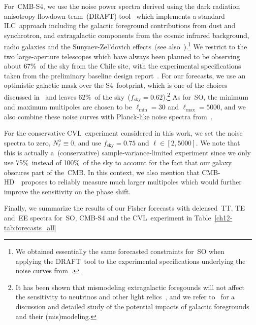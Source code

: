 \begin{subappendices}
For~\mbox{CMB-S4}, we use the noise power spectra derived using the dark radiation anisotropy flowdown team~(DRAFT) tool~\cite{CMB-S4:inprep, Raghunathan:draft} which implements a standard ILC~approach including the galactic foreground contributions from dust and synchrotron, and extragalactic components from the cosmic infrared background, radio galaxies and the Sunyaev-Zel'dovich effects~(see also~\cite{Raghunathan:2023yfe}).\footnote{We obtained essentially the same forecasted constraints for~SO when applying the DRAFT~tool to the experimental specifications underlying the noise curves from~\cite{SimonsObservatory:2020noise}.} We restrict to the two large-aperture telescopes which have always been planned to be observing about 67\%~of the sky from the Chile site, with the experimental specifications taken from the preliminary baseline design report~\cite{CMB-S4:pbdr}. For our forecasts, we use an optimistic galactic mask over the S4~footprint, which is one of the choices discussed in~\cite{CMB-S4:inprep, Raghunathan:inprep} and leaves 62\%~of the sky~($f_\mathrm{sky} = 0.62$).\footnote{It has been shown that mismodeling extragalactic foregounds will not affect the sensitivity to neutrinos and other light relics~\cite{Raghunathan:2023yfe}, and we refer to~\cite{CMB-S4:inprep, Raghunathan:inprep} for a discussion and detailed study of the potential impacts of galactic foregrounds and their (mis)modeling.} As for~SO, the minimum and maximum multipoles are chosen to be $\ell_\mathrm{min} = 30$ and $\ell_\mathrm{max} = 5000$, and we also combine these noise curves with Planck-like noise spectra from~\cite{Allison:2015qca}.

For the conservative CVL~experiment considered in this work, we set the noise spectra to zero, $N_\ell^a \equiv 0$, and use $f_\mathrm{sky} = 0.75$ and $\ell \in [2, 5000]$. We note that this is actually a~(conservative) sample-variance-limited experiment since we only use 75\%~instead of 100\%~of the sky to account for the fact that our galaxy obscures part of the~CMB. In this context, we also mention that \mbox{CMB-HD}~\cite{CMB-HD:2022bsz}~proposes to reliably measure much larger multipoles which would further improve the sensitivity on the phase shift.\medskip

Finally, we summarize the results of our Fisher forecasts with delensed~TT, TE and~EE spectra for~SO, \mbox{CMB-S4} and the CVL~experiment in Table~\ref{ch12-tab:forecasts_all}%
\begin{table}
	\centering\small\setlength{\tabcolsep}{4pt}
	\begin{subtable}{\textwidth}
		\centering


\end{subtable}
\end{table}
\end{subappendices}
